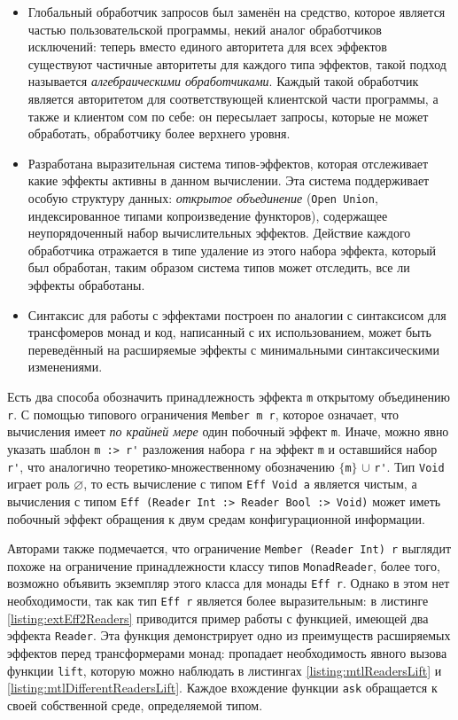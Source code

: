 \begin{itemize}
  \item 
Глобальный обработчик запросов был заменён на средство, которое является частью пользовательской программы, некий аналог обработчиков исключений: теперь вместо единого авторитета для всех эффектов существуют частичные авторитеты для каждого типа эффектов, такой подход называется \emph{алгебраическими обработчиками}. Каждый такой обработчик является авторитетом для соответствующей клиентской части программы, а также и клиентом сом по себе: он пересылает запросы, которые не может обработать, обработчику более верхнего уровня. 
  \item 
Разработана выразительная система типов-эффектов, которая отслеживает какие эффекты активны в данном вычислении. Эта система поддерживает особую структуру данных: \emph{открытое объединение} (\lstinline{Open Union}, индексированное типами копроизведение функторов), содержащее неупорядоченный набор вычислительных эффектов. Действие каждого обработчика отражается в типе удаление из этого набора эффекта, который был обработан, таким образом система типов может отследить, все ли эффекты обработаны. 
  \item 
Синтаксис для работы с эффектами построен по аналогии с синтаксисом для трансфомеров монад и код, написанный с их использованием, может быть переведённый на расширяемые эффекты с минимальными синтаксическими изменениями.  
\end{itemize} 

Есть два способа обозначить принадлежность эффекта \lstinline{m} открытому объединению \lstinline{r}. С помощью типового ограничения \lstinline{Member m r}, которое означает, что вычисления имеет \emph{по крайней мере} один побочный эффект \lstinline{m}. Иначе, можно явно указать шаблон \lstinline{m :> r'} разложения набора \lstinline{r} на эффект \lstinline{m} и оставшийся набор \lstinline{r'}, что аналогично теоретико-множественному обозначению $\{$\lstinline{m}$\}$ $\cup$ \lstinline{r'}. Тип \lstinline{Void} играет роль $\varnothing$, то есть вычисление с типом \lstinline{Eff Void a} является чистым, а вычисления с типом \lstinline{Eff (Reader Int :> Reader Bool :> Void)} может иметь побочный эффект обращения к двум средам конфигурационной информации.

Авторами также подмечается, что ограничение \lstinline{Member (Reader Int) r} выглядит похоже на ограничение принадлежности классу типов \lstinline{MonadReader}, более того, возможно объявить экземпляр этого класса для монады \lstinline{Eff r}. Однако в этом нет необходимости, так как тип \lstinline{Eff r} является более выразительным: в листинге \ref{listing:extEff2Readers} приводится пример работы с функцией, имеющей два эффекта \lstinline{Reader}. Эта функция демонстрирует одно из преимуществ расширяемых эффектов перед трансформерами монад: пропадает необходимость явного вызова функции \lstinline{lift}, которую можно наблюдать в листингах \ref{listing:mtlReadersLift} и \ref{listing:mtlDifferentReadersLift}. Каждое вхождение функции \lstinline{ask} обращается к своей собственной среде, определяемой типом. 

